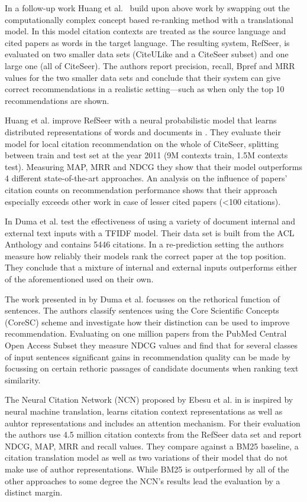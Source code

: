 In a follow-up work Huang et al.~\cite{Huang2014} build upon above work by swapping out the computationally complex concept based re-ranking method with a translational model. In this model citation contexts are treated as the source language and cited papers as words in the target language. The resulting system, RefSeer, is evaluated on two smaller data sets (CiteULike and a CiteSeer subset) and one large one (all of CiteSeer). The authors report precision, recall, Bpref and MRR values for the two smaller data sets and conclude that their system can give correct recommendations in a realistic setting---such as when only the top 10 recommendations are shown.

Huang et al. improve RefSeer with a neural probabilistic model that learns distributed representations of words and documents in \cite{Huang2015}. They evaluate their model for local citation recommendation on the whole of CiteSeer, splitting between train and test set at the year 2011 (9M contexts train, 1.5M contexts test). Measuring MAP, MRR and NDCG they show that their model outperforms 4 different state-of-the-art approaches. An analysis on the influence of papers' citation counts on recommendation performance shows that their approach especially exceeds other work in case of lesser cited papers (<100 citations).

In \cite{Duma2014} Duma et al. test the effectiveness of using a variety of document internal and external text inputs with a TFIDF model. Their data set is built from the ACL Anthology and contains 5446 citations. In a re-prediction setting the authors measure how reliably their models rank the correct paper at the top position. %
They conclude that a mixture of internal and external inputs outperforms either of the aforementioned used on their own.

The work presented in \cite{Duma2016} by Duma et al. focusses on the rethorical function of sentences. The authors classify sentences using the Core Scientific Concepts (CoreSC) scheme and investigate how their distinction can be used to improve recommendation. Evaluating on one million papers from the PubMed Central Open Access Subset they measure NDCG values and find that for several classes of input sentences significant gains in recommendation quality can be made by focussing on certain rethoric passages of candidate documents when ranking text similarity.

The Neural Citation Network (NCN) proposed by Ebesu et al. in \cite{Ebesu2017} is inspired by neural machine translation, learns citation context representations as well as auhtor representations and includes an attention mechanism. For their evaluation the authors use 4.5 million citation contexts from the RefSeer data set and report NDCG, MAP, MRR and recall values. They compare against a BM25 baseline, a citation translation model as well as two variations of their model that do not make use of author representations. While BM25 is outperformed by all of the other approaches to some degree the NCN's results lead the evaluation by a distinct margin.

